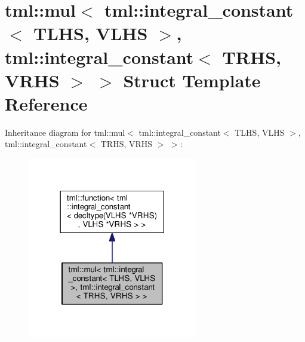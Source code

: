 \hypertarget{structtml_1_1mul_3_01tml_1_1integral__constant_3_01_t_l_h_s_00_01_v_l_h_s_01_4_00_01tml_1_1integ22c07a399e3a043e235209b31f9326d2}{\section{tml\+:\+:mul$<$ tml\+:\+:integral\+\_\+constant$<$ T\+L\+H\+S, V\+L\+H\+S $>$, tml\+:\+:integral\+\_\+constant$<$ T\+R\+H\+S, V\+R\+H\+S $>$ $>$ Struct Template Reference}
\label{structtml_1_1mul_3_01tml_1_1integral__constant_3_01_t_l_h_s_00_01_v_l_h_s_01_4_00_01tml_1_1integ22c07a399e3a043e235209b31f9326d2}
}


Inheritance diagram for tml\+:\+:mul$<$ tml\+:\+:integral\+\_\+constant$<$ T\+L\+H\+S, V\+L\+H\+S $>$, tml\+:\+:integral\+\_\+constant$<$ T\+R\+H\+S, V\+R\+H\+S $>$ $>$\+:
\nopagebreak
\begin{figure}[H]
\begin{center}
\leavevmode
\includegraphics[width=210pt]{structtml_1_1mul_3_01tml_1_1integral__constant_3_01_t_l_h_s_00_01_v_l_h_s_01_4_00_01tml_1_1integfeec7739a0de7431f150786a3f8878ad}
\end{center}
\end{figure}


